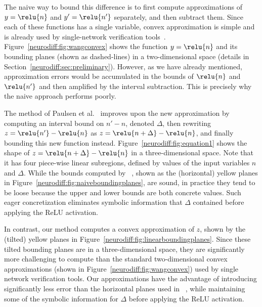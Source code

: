 The naive way to bound this difference is to first compute
approximations of $ y = \relu{n} $ and $ y' = \relu{n'} $ separately,
and then subtract them.  Since each of these functions has a single
variable, convex approximation is simple and is already used by
single-network verification tools~\cite{SinghGPV19,WangPWYJ18nips,WengZCSHDBD18}.
Figure~\ref{neurodiff:fig:wangconvex} shows the function $y=\relu{n}$ and its
bounding planes (shown as dashed-lines) in a two-dimensional space (details in
Section~\ref{neurodiff:sec:preliminary}).
%
However, as we have already mentioned, approximation errors would be
accumulated in the bounds of $\relu{n}$ and $\relu{n'}$ and then amplified
by the interval subtraction.  This is precisely why the naive approach
performs poorly.


The \ReluDiff{} method of Paulsen et al.~\cite{paulsen2020reludiff} improves
upon the new approximation by computing an interval bound on $ n' - n
$, denoted $ \Delta $, then rewriting $z = \relu{n'} - \relu{n} $ as $
z= \relu{n + \Delta} - \relu{n} $, and finally bounding this new
function instead.
%
Figure~\ref{neurodiff:fig:equation1} shows the shape of $ z = \relu{n
+ \Delta}- \relu{n} $ in a three-dimensional space. Note that it has
four piece-wise linear subregions, defined by values of the input
variables $n$ and $\Delta$.
%
While the bounds computed by \ReluDiff{}~\cite{paulsen2020reludiff}, shown as
the (horizontal) yellow planes in
Figure~\ref{neurodiff:fig:naiveboundingplanes}, are sound, in practice they tend
to be loose because the upper and lower bounds are both concrete
values.  Such eager concretization eliminates symbolic information
that $ \Delta $ contained before applying the ReLU activation.


In contrast, our method computes a convex approximation of $ z $,
shown by the (tilted) yellow planes in
Figure~\ref{neurodiff:fig:linearboundingplanes}.
%
Since these tilted bounding planes are in a three-dimensional space,
they are significantly more challenging to compute than the standard
two-dimensional convex approximations (shown in
Figure~\ref{neurodiff:fig:wangconvex})
used by single network verification tools.
%
Our approximations have the advantage of introducing significantly less
error than the horizontal planes used
in \ReluDiff{}~\cite{paulsen2020reludiff}, while maintaining some of the
symbolic information for $ \Delta $ before applying the ReLU
activation.


